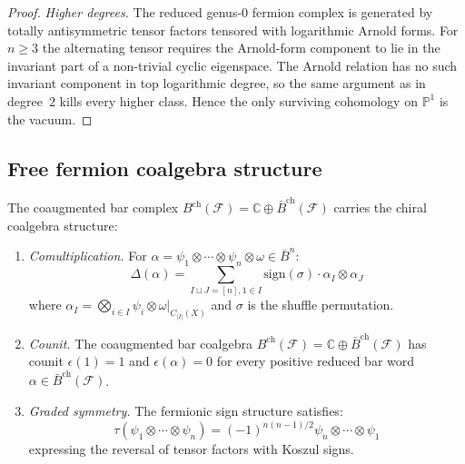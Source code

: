 \begin{proof}
\emph{Higher degrees.} The reduced genus-$0$ fermion complex is
generated by totally antisymmetric tensor factors tensored with
logarithmic Arnold forms. For $n\geq 3$ the alternating tensor
requires the Arnold-form component to lie in the invariant part of a
non-trivial cyclic eigenspace. The Arnold relation has no such
invariant component in top logarithmic degree, so the same argument
as in degree~$2$ kills every higher class. Hence the only surviving
cohomology on $\mathbb{P}^1$ is the vacuum.
\end{proof}



\subsection{Free fermion coalgebra structure}

\begin{theorem}\label{thm:fermion-bar-coalg}
The coaugmented bar complex
$B^{\text{ch}}(\mathcal{F})=\mathbb{C}\oplus
\bar{B}^{\text{ch}}(\mathcal{F})$ carries the chiral coalgebra structure:
\begin{enumerate}
\item \emph{Comultiplication.} For $\alpha = \psi_1 \otimes \cdots \otimes \psi_n \otimes \omega \in \bar{B}^n$:
\[
\Delta(\alpha) = \sum_{I \sqcup J = [n], 1 \in I} \text{sign}(\sigma) \cdot \alpha_I \otimes \alpha_J
\]
where $\alpha_I = \bigotimes_{i \in I} \psi_i \otimes \omega|_{C_{|I|}(X)}$ and $\sigma$ is the shuffle permutation.

\item \emph{Counit.} The coaugmented bar coalgebra
$B^{\mathrm{ch}}(\mathcal{F})=\mathbb{C}\oplus
\bar{B}^{\mathrm{ch}}(\mathcal{F})$ has counit
$\epsilon(1)=1$ and
$\epsilon(\alpha)=0$ for every positive reduced bar word
$\alpha\in\bar{B}^{\mathrm{ch}}(\mathcal{F})$.

\item \emph{Graded symmetry.} The fermionic sign structure satisfies:
\[
\tau(\psi_1 \otimes \cdots \otimes \psi_n) = (-1)^{n(n-1)/2} \psi_n \otimes \cdots \otimes \psi_1
\]
expressing the reversal of tensor factors with Koszul signs.
\end{enumerate}
\end{theorem}

